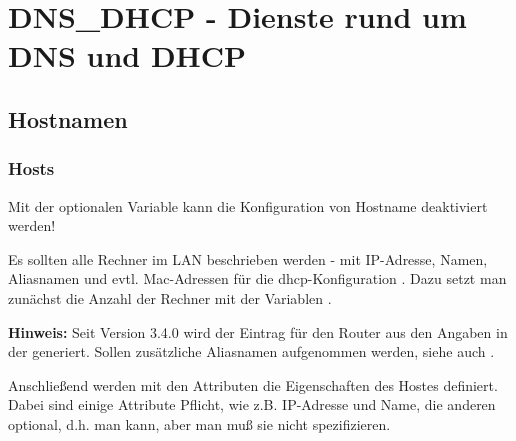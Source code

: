 {
\section{DNS\_DHCP - Dienste rund um DNS und DHCP}
}
\subsection{Hostnamen}
\subsubsection{Hosts}
\begin{description}
    
    Mit der optionalen Variable  kann die Konfiguration von
    Hostname deaktiviert werden!
    

    {Es sollten alle Rechner im LAN beschrieben werden - mit
      IP-Adresse, Namen, Aliasnamen und evtl. Mac-Adressen für die
      dhcp-Konfiguration . Dazu setzt man zunächst die Anzahl der
      Rechner mit der Variablen .

      \textbf{Hinweis: } Seit Version 3.4.0 wird der Eintrag für den
      Router aus den Angaben in der  generiert.
      Sollen zusätzliche Aliasnamen aufgenommen werden, siehe auch
       .

      Anschließend werden mit den Attributen die Eigenschaften des
      Hostes definiert. Dabei sind einige Attribute Pflicht, wie z.B.
      IP-Adresse und Name, die anderen optional, d.h. man kann, aber
      man muß sie nicht spezifizieren.

}
\end{description}

